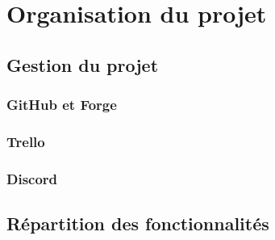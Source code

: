 \chapter{Organisation du projet}



	\section{Gestion du projet}

		\subsection{GitHub et Forge}



		\subsection{Trello}



		\subsection{Discord}



	\section{Répartition des fonctionnalités}
